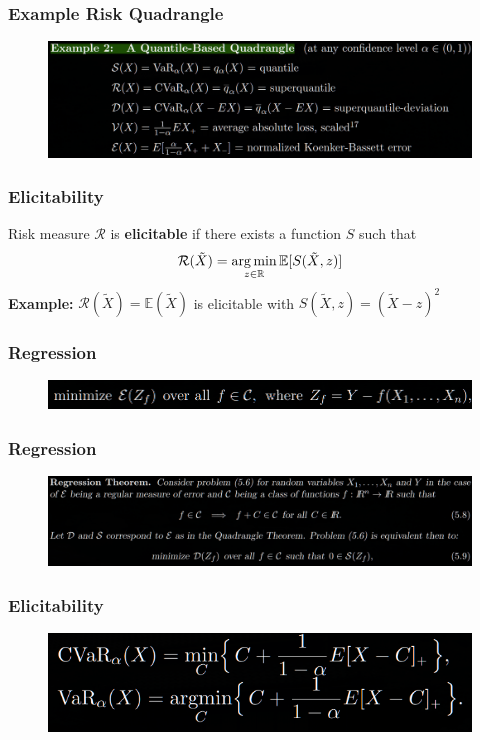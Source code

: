 \documentclass{beamer}
\begin{document}
\begin{frame}
	\frametitle{Example Risk Quadrangle}
  \vfill
  \begin{figure}[ht]
    \centering
    \includegraphics[width=\textwidth]{./imgs/quantile_example.png}
  \end{figure}
  \vfill
\end{frame}
\begin{frame}
	\frametitle{Elicitability}
  \vfill
  Risk measure $\mathcal{R}$ is \textbf{elicitable} if there exists a function $S$ such that
  $$\mathcal{R}(\tilde{X}) = \operatorname*{arg\,min}_{z \in \mathbb{R}}\mathbb{E}[S(\tilde{X}, z)]$$
  \vfill
  \textbf{Example:} $\mathcal{R}(\tilde{X}) = \mathbb{E}(\tilde{X})$ is elicitable with $S(\tilde{X}, z) = (\tilde{X} - z)^2$
\end{frame}
\begin{frame}
	\frametitle{Regression}
  \vfill
  \begin{figure}[ht]
    \centering
    \includegraphics[width=\textwidth]{./imgs/5-6.png}
  \end{figure}
  \vfill
\end{frame}
\begin{frame}
	\frametitle{Regression}
  \vfill
  \begin{figure}[ht]
    \centering
    \includegraphics[width=\textwidth]{./imgs/5-9.png}
  \end{figure}
  \vfill
\end{frame}
\begin{frame}
	\frametitle{Elicitability}
  \vfill
  \begin{figure}[ht]
    \centering
    \includegraphics[width=\textwidth]{./imgs/is_var_elicitable.png}
  \end{figure}
  \vfill
\end{frame}
\end{document}
